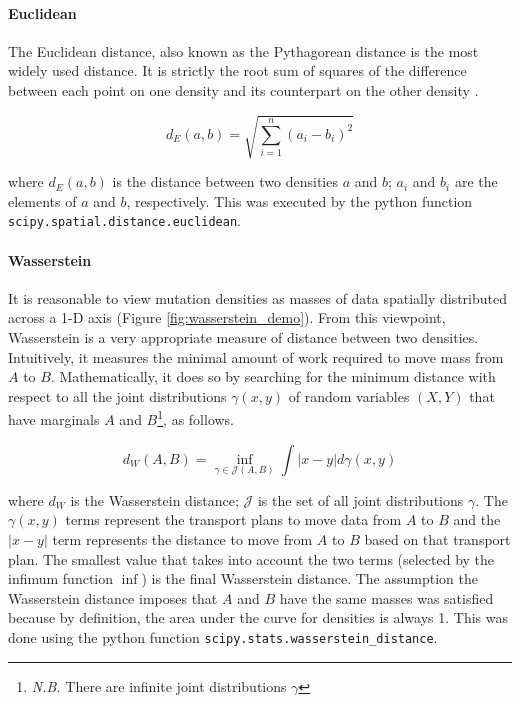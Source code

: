 \paragraph{Euclidean} The Euclidean distance, also known as the Pythagorean distance is the most widely used distance. It is strictly the root sum of squares of the difference between each point on one density and its counterpart on the other density \citep[equation \ref{eq:euclid};][]{ONeill2006FrameFields}.

\begin{equation}
    d_E(a,b) = \sqrt{\sum_{i=1}^n (a_i - b_i)^2}
    \label{eq:euclid}
\end{equation}

where $d_E(a,b)$ is the distance between two densities $a$ and $b$; $a_i$ and $b_i$ are the elements of $a$ and $b$, respectively. This was executed by the python function \texttt{scipy.spatial.distance.euclidean}.

\paragraph{Wasserstein} It is reasonable to view mutation densities as masses of data spatially distributed across a 1-D axis (Figure \ref{fig:wasserstein_demo}). From this viewpoint, Wasserstein is a very appropriate measure of distance between two densities. Intuitively, it measures the minimal amount of work required to move mass from $A$ to $B$. Mathematically, it does so by searching for the minimum distance with respect to all the joint distributions $\gamma(x,y)$ of random variables $(X,Y)$ that have \glspl{marginal} $A$ and $B$\footnote{\textit{N.B.} There are infinite joint distributions $\gamma$}, as follows.

\begin{equation}
    d_W(A,B) = \underset{\gamma \in \mathcal{J}(A,B)}{\inf} \int |x-y| d \gamma(x,y) 
    \label{eq:wassertein}
\end{equation}

where $d_W$ is the Wasserstein distance; $\mathcal{J}$ is the set of all joint distributions $\gamma$. The $\gamma(x,y)$ terms represent the transport plans to move data from $A$ to $B$ and the $|x-y|$ term represents the distance to move from $A$ to $B$ based on that transport plan. The smallest value that takes into account the two terms (selected by the infimum function $\inf$) is the final Wasserstein distance. The assumption the Wasserstein distance imposes that $A$ and $B$ have the same masses was satisfied because by definition, the area under the curve for densities is always 1. This was done using the python function \texttt{scipy.stats.wasserstein\_distance}.

